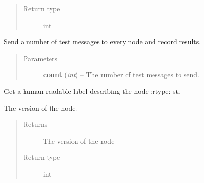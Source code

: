 \documentclass[letterpaper,10pt,english]{sphinxmanual}
\begin{document}
\begin{fulllineitems}
\begin{fulllineitems}
\begin{quote}
\begin{description}
\item[{Return type}] \leavevmode
int

\end{description}\end{quote}

\end{fulllineitems}


\begin{fulllineitems}
\label{node:openzwave.node.ZWaveNode.test}
Send a number of test messages to every node and record results.
\begin{quote}\begin{description}
\item[{Parameters}] \leavevmode
\textbf{count} (\emph{int}) -- The number of test messages to send.

\end{description}\end{quote}

\end{fulllineitems}


\begin{fulllineitems}
\label{node:openzwave.node.ZWaveNode.type}
Get a human-readable label describing the node
:rtype: str

\end{fulllineitems}


\begin{fulllineitems}
\label{node:openzwave.node.ZWaveNode.version}
The version of the node.
\begin{quote}\begin{description}
\item[{Returns}] \leavevmode
The version of the node

\item[{Return type}] \leavevmode
int

\end{description}\end{quote}

\end{fulllineitems}


\end{fulllineitems}
\end{document}

